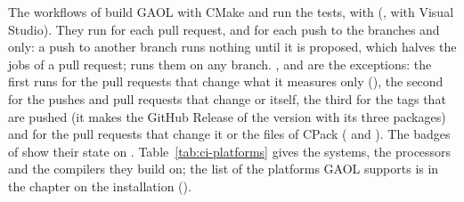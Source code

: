 The workflows of  build GAOL with CMake and run the
tests, with  (,
 with Visual Studio). They run for each pull request, and
for each push to the branches  and  only: a push to
another branch runs nothing until it
is proposed, which halves the jobs of a pull request;\newinvfive{}
 runs them on any branch. ,
 and  are the exceptions: the first runs for
the pull requests that change what it measures only (), the
second for the pushes and pull requests that change  or itself,
the third for the tags that are pushed (it makes the GitHub Release of the
version with its three packages) and for the pull requests that change it or
the files of CPack ( and ). The badges of  show
their state on . Table~\ref{tab:ci-platforms} gives
the systems, the processors and the compilers they build on; the list of
the platforms GAOL supports is in the chapter on the installation
().

